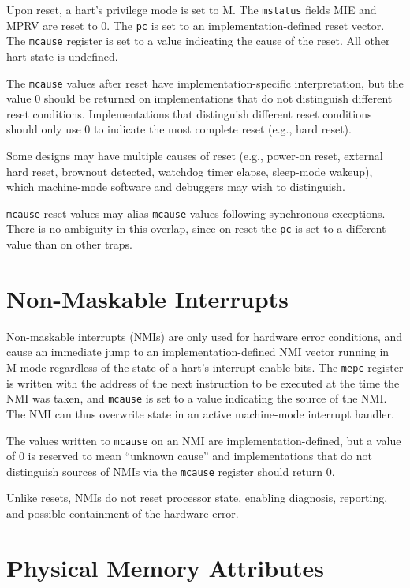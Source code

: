 Upon reset, a hart's privilege mode is set to M.  The {\tt mstatus} fields MIE
and MPRV are reset to 0.  The {\tt pc} is
set to an implementation-defined reset vector.  The {\tt mcause} register is
set to a value indicating the cause of the reset.  All other hart state is
undefined.

The {\tt mcause} values after reset have implementation-specific
interpretation, but the value 0 should be returned on implementations
that do not distinguish different reset conditions. Implementations
that distinguish different reset conditions should only use 0 to
indicate the most complete reset (e.g., hard reset).

\begin{commentary}
Some designs may have multiple causes of reset (e.g., power-on reset,
external hard reset, brownout detected, watchdog timer elapse,
sleep-mode wakeup), which machine-mode software and debuggers may wish
to distinguish.

{\tt mcause} reset values may alias {\tt mcause} values following
synchronous exceptions.  There is no ambiguity in this overlap, since
on reset the {\tt pc} is set to a different value than on other traps.
\end{commentary}

\section{Non-Maskable Interrupts}
\label{sec:nmi}

Non-maskable interrupts (NMIs) are only used for hardware error
conditions, and cause an immediate jump to an implementation-defined
NMI vector running in M-mode regardless of the state of a hart's
interrupt enable bits.  The {\tt mepc} register is written with the
address of the next instruction to be executed at the time the NMI was
taken, and {\tt mcause} is set to a value indicating the source of the
NMI.  The NMI can thus overwrite state in an active machine-mode
interrupt handler.

The values written to {\tt mcause} on an NMI are
implementation-defined, but a value of 0 is reserved to mean ``unknown
cause'' and implementations that do not distinguish sources of NMIs
via the {\tt mcause} register should return 0.

Unlike resets, NMIs do not reset processor state, enabling diagnosis,
reporting, and possible containment of the hardware error.

\section{Physical Memory Attributes}
\label{sec:pma}

